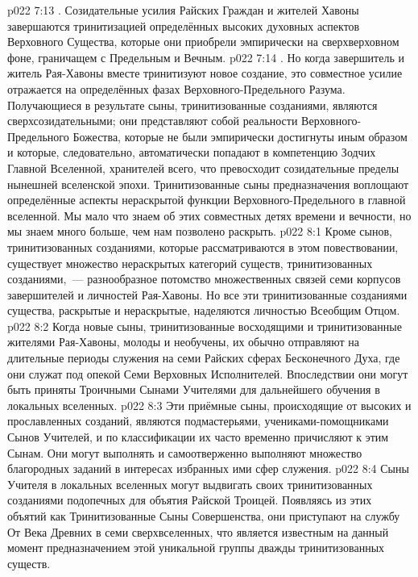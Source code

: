 \vs p022 7:13 . Созидательные усилия Райских Граждан и жителей Хавоны завершаются тринитизацией определённых высоких духовных аспектов Верховного Существа, которые они приобрели эмпирически на сверхверховном фоне, граничащем с Предельным и Вечным.
\vs p022 7:14 . Но когда завершитель и житель Рая\hyp{}Хавоны вместе тринитизуют новое создание, это совместное усилие отражается на определённых фазах Верховного\hyp{}Предельного Разума. Получающиеся в результате сыны, тринитизованные созданиями, являются сверхсозидательными; они представляют собой реальности Верховного\hyp{}Предельного Божества, которые не были эмпирически достигнуты иным образом и которые, следовательно, автоматически попадают в компетенцию Зодчих Главной Вселенной, хранителей всего, что превосходит созидательные пределы нынешней вселенской эпохи. Тринитизованные сыны предназначения воплощают определённые аспекты нераскрытой функции Верховного\hyp{}Предельного в главной вселенной. Мы мало что знаем об этих совместных детях времени и вечности, но мы знаем много больше, чем нам позволено раскрыть.
\vs p022 8:1 Кроме сынов, тринитизованных созданиями, которые рассматриваются в этом повествовании, существует множество нераскрытых категорий существ, тринитизованных созданиями,~--- разнообразное потомство множественных связей семи корпусов завершителей и личностей Рая\hyp{}Хавоны. Но все эти тринитизованные созданиями существа, раскрытые и нераскрытые, наделяются личностью Всеобщим Отцом.
\vs p022 8:2 \pc Когда новые сыны, тринитизованные восходящими и тринитизованные жителями Рая\hyp{}Хавоны, молоды и необучены, их обычно отправляют на длительные периоды служения на семи Райских сферах Бесконечного Духа, где они служат под опекой Семи Верховных Исполнителей. Впоследствии они могут быть приняты Троичными Сынами Учителями для дальнейшего обучения в локальных вселенных.
\vs p022 8:3 Эти приёмные сыны, происходящие от высоких и прославленных созданий, являются подмастерьями, учениками\hyp{}помощниками Сынов Учителей, и по классификации их часто временно причисляют к этим Сынам. Они могут выполнять и самоотверженно выполняют множество благородных заданий в интересах избранных ими сфер служения.
\vs p022 8:4 Сыны Учителя в локальных вселенных могут выдвигать своих тринитизованных созданиями подопечных для объятия Райской Троицей. Появляясь из этих объятий как Тринитизованные Сыны Совершенства, они приступают на службу От Века Древних в семи сверхвселенных, что является известным на данный момент предназначением этой уникальной группы дважды тринитизованных существ.
